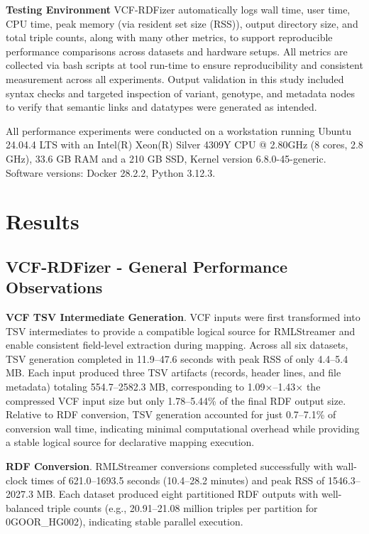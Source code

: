 \documentclass[unnumsec,webpdf,contemporary,large]{oup-authoring-template}
\begin{document}
\textbf{Testing Environment}
VCF-RDFizer automatically logs wall time, user time, CPU time, peak memory (via resident set size (RSS)), output directory size, and total triple counts, along with many other metrics, to support reproducible performance comparisons across datasets and hardware setups. 
All metrics are collected via bash scripts at tool run-time to ensure reproducibility and consistent measurement across all experiments. 
Output validation in this study included syntax checks and targeted inspection of variant, genotype, and metadata nodes to verify that semantic links and datatypes were generated as intended.

All performance experiments were conducted on a workstation running Ubuntu 24.04.4 LTS with an Intel(R) Xeon(R) Silver 4309Y CPU @ 2.80GHz (8 cores, 2.8 GHz), 33.6 GB RAM and a 210 GB SSD, Kernel version 6.8.0-45-generic. Software versions: Docker 28.2.2, Python 3.12.3.



\section{Results}\label{sec3}

\subsection{VCF-RDFizer - General Performance Observations}\label{subsec3.1} 

\textbf{VCF TSV Intermediate Generation}.
VCF inputs were first transformed into TSV intermediates to provide a compatible logical source for RMLStreamer and enable consistent field-level extraction during mapping.
Across all six datasets, TSV generation completed in 11.9--47.6 seconds with peak RSS of only 4.4--5.4 MB.
Each input produced three TSV artifacts (records, header lines, and file metadata) totaling 554.7--2582.3 MB, corresponding to 1.09$\times$--1.43$\times$ the compressed VCF input size but only 1.78--5.44\% of the final RDF output size.
Relative to RDF conversion, TSV generation accounted for just 0.7--7.1\% of conversion wall time, indicating minimal computational overhead while providing a stable logical source for declarative mapping execution.


\textbf{RDF Conversion}.
RMLStreamer conversions completed successfully with wall-clock times of 621.0--1693.5 seconds (10.4--28.2 minutes) and peak RSS of 1546.3--2027.3 MB.
Each dataset produced eight partitioned RDF outputs with well-balanced triple counts (e.g., 20.91--21.08 million triples per partition for 0GOOR\_HG002), indicating stable parallel execution.
\end{document}
